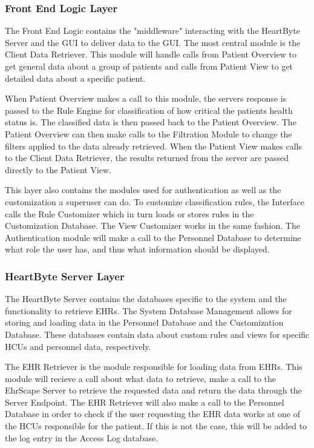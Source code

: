 \documentclass{article}
\begin{document}
\subsubsection{Front End Logic Layer}
The Front End Logic contains the "middleware" interacting with the HeartByte Server and the GUI to deliver data to the GUI. The most central module is the Client Data Retriever. This module will handle calls from Patient Overview to get general data about a group of patients and calls from Patient View to get detailed data about a specific patient. 

When Patient Overview makes a call to this module, the servers response is passed to the Rule Engine for classification of how critical the patients health status is. The classified data is then passed back to the Patient Overview. The Patient Overview can then make calls to the Filtration Module to change the filters applied to the data already retrieved. When the Patient View makes calls to the Client Data Retriever, the results returned from the server are passed directly to the Patient View.

This layer also contains the modules used for authentication as well as the customization a superuser can do. To customize classification rules, the Interface calls the Rule Customizer which in turn loads or stores rules in the Customization Database. The View Customizer works in the same fashion. The Authentication module will make a call to the Personnel Database to determine what role the user has, and thus what information should be displayed.

\subsubsection{HeartByte Server Layer}
The HeartByte Server contains the databases specific to the system and the functionality to retrieve EHRs. The System Database Management allows for storing and loading data in the Personnel Database and the Customization Database. These databases contain data about custom rules and views for specific HCUs and personnel data, respectively.

The EHR Retriever is the module responsible for loading data from EHRs. This module will recieve a call about what data to retrieve, make a call to the EhrScape Server to retrieve the requested data and return the data through the Server Endpoint. The EHR Retriever will also make a call to the Personnel Database in order to check if the user requesting the EHR data works at one of the HCUs responsible for the patient. If this is not the case, this will be added to the log entry in the Access Log database.
\end{document}
